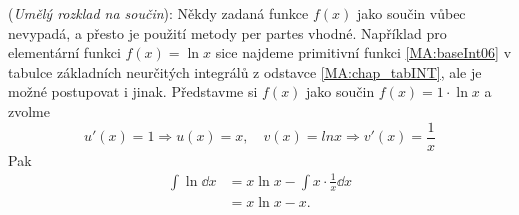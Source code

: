 \begin{mdframed}[style=mdexam]
  \begin{example}\label{mai:exam109}
    (\emph{Umělý rozklad na součin}): Někdy zadaná funkce \(f(x)\) jako součin vůbec nevypadá, a
    přesto je použití metody per partes vhodné. Například pro elementární funkci \(f(x) = \ln x\)
    sice najdeme primitivní funkci \ref{MA:baseInt06} v tabulce základních neurčitých integrálů z
    odstavce \ref{MA:chap_tabINT}, ale je možné postupovat i jinak. Představme si \(f(x)\) jako
    součin \(f(x) = 1\cdot\ln x\) a zvolme \[u'(x) = 1 ⇒ u(x) = x, \quad v(x) = lnx ⇒ v'(x) =
    \frac{1}{x}\] Pak 
    \begin{align*}
      \int\ln\dd{x} &= x\ln x - \int x\cdot\frac{1}{x}\dd{x}  \\ 
                    &= x\ln x - x.
    \end{align*}
  \end{example}
\end{mdframed}